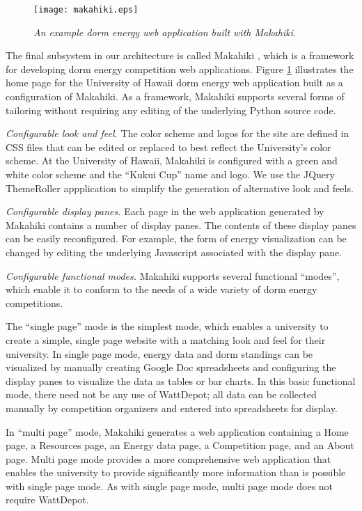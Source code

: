 \begin{figure}[!th]
  \center
  \texttt{[image: makahiki.eps]}
  \caption{\em \small An example dorm energy web application built with Makahiki.}
  \label{fig:makahiki}
\end{figure} 

The final subsystem in our architecture is called Makahiki \cite{makahiki-site}, which is a
framework for developing dorm energy competition web applications.  Figure
\ref{fig:makahiki} illustrates the home page for the University of Hawaii
dorm energy web application built as a configuration of Makahiki. As a
framework, Makahiki supports several forms of tailoring without requiring
any editing of the underlying Python source code.

{\em Configurable look and feel.} The color scheme and logos for the site
are defined in CSS files that can be edited or replaced to best reflect the
University's color scheme. At the University of Hawaii, Makahiki is
configured with a green and white color scheme and the ``Kukui Cup'' name
and logo.   We use the JQuery ThemeRoller appplication to simplify the generation of 
alternative look and feels.

{\em Configurable display panes.} Each page in the web application generated by Makahiki
contains a number of display panes. The contents of these display panes can be easily 
reconfigured. For example, the form of energy visualization can be changed by editing 
the underlying Javascript associated with the display pane. 

{\em Configurable functional modes.}  Makahiki supports several functional ``modes'', which 
enable it to conform to the needs of a wide variety of dorm energy competitions.  

The ``single page'' mode is the simplest mode, which enables a university
to create a simple, single page website with a matching look and feel for
their university.  In single page mode, energy data and dorm standings can
be visualized by manually creating Google Doc spreadsheets and configuring
the display panes to visualize the data as tables or bar charts.  In this
basic functional mode, there need not be any use of WattDepot; all data can
be collected manually by competition organizers and entered into
spreadsheets for display.

In ``multi page'' mode, Makahiki generates a web application containing a
Home page, a Resources page, an Energy data page, a Competition page, and
an About page.  Multi page mode provides a more comprehensive web
application that enables the university to provide significantly more
information than is possible with single page mode.  As with single page
mode, multi page mode does not require WattDepot.


